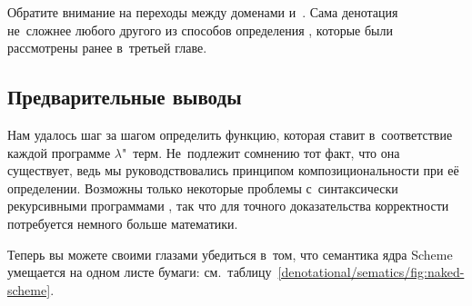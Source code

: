 Обратите внимание на переходы между доменами  и~.
Сама денотация не~сложнее любого другого из способов определения ,
которые были рассмотрены ранее в~третьей главе.



\subsection{Предварительные выводы}%
\label{denotational/sematics/ssect:conclusions}

Нам удалось шаг за шагом определить функцию, которая ставит в~соответствие
каждой программе $\lambda$"~терм. Не~подлежит сомнению тот факт, что она
существует, ведь мы руководствовались принципом композициональности при её
определении. Возможны только некоторые проблемы с~синтаксически рекурсивными
программами \cite{que92a}, так что для точного доказательства корректности
потребуется немного больше математики.

Теперь вы можете своими глазами убедиться в~том, что семантика ядра Scheme
умещается на одном листе бумаги:
см.~таблицу~\ref{denotational/sematics/fig:naked-scheme}.

